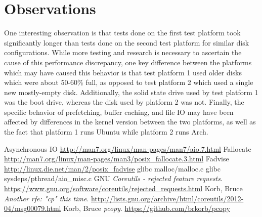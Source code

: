 \documentclass[12pt]{article}
\begin{document}
\section{Observations}
One interesting observation is that tests done on the first test platform took significantly longer
than tests done on the second test platform for similar disk configurations. While more testing and
research is necessary to ascertain the cause of this performance discrepancy, one key difference between
the platforms which may have caused this behavior is that test platform 1 used older disks which were
about 50-60\% full, as opposed to test platform 2 which used a single new mostly-empty disk. Additionally,
the solid state drive used by test platform 1 was the boot drive, whereas the disk used by platform 2
was not. Finally, the specific behavior of prefetching, buffer caching, and file IO may have been affected by differences
in the kernel version between the two platforms, as well as the fact that platform 1 runs Ubuntu while platform 2 runs Arch. \\

\begin{thebibliography}{9}
    Asynchronous IO
    \url{http://man7.org/linux/man-pages/man7/aio.7.html}
    Fallocate
    \url{http://man7.org/linux/man-pages/man3/posix_fallocate.3.html}
    Fadvise
    \url{http://linux.die.net/man/2/posix_fadvise}
    glibc
    malloc/malloc.c
    glibc
    sysdeps/pthread/aio\_misc.c
    GNU
    \emph{Coreutils - rejected feature requests}.
    \url{https://www.gnu.org/software/coreutils/rejected_requests.html}
    Korb, Bruce
    \emph{Another rfe: "cp" this time}.
    \url{http://lists.gnu.org/archive/html/coreutils/2012-04/msg00079.html}
    Korb, Bruce
    \emph{pcopy}.
    \url{https://github.com/brkorb/pcopy}
\end{thebibliography}
\end{document}
